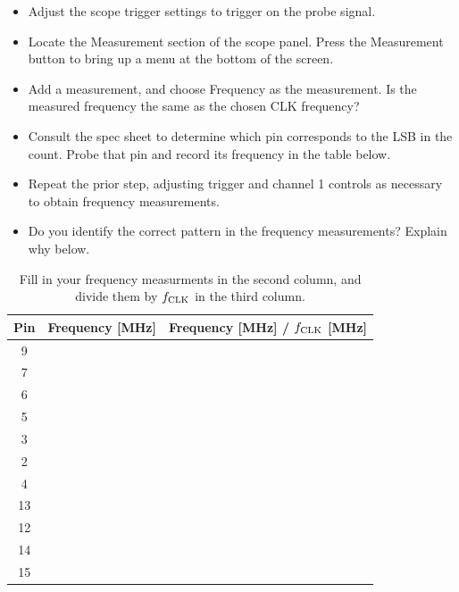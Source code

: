 \documentclass{article}
\begin{document}
\begin{itemize}
\item Adjust the scope trigger settings to trigger on the probe signal.
\item Locate the Measurement section of the scope panel.  Press the Measurement button to bring up a menu at the bottom of the screen.
\item Add a measurement, and choose Frequency as the measurement.  Is the measured frequency the same as the chosen CLK frequency?
\item Consult the spec sheet to determine which pin corresponds to the LSB in the count.  Probe that pin and record its frequency in the table below.
\item Repeat the prior step, adjusting trigger and channel 1 controls as necessary to obtain frequency measurements.
\item Do you identify the correct pattern in the frequency measurements?  Explain why below.
\end{itemize}

\begin{table}
\centering
\begin{tabular}{| c | c | c |}
\hline
Pin & Frequency [MHz] & Frequency [MHz] / $f_{\rm CLK}$ [MHz] \\ \hline
9 & & \\ \hline
7 & & \\ \hline
6 & & \\ \hline
5 & & \\ \hline
3 & & \\ \hline
2 & & \\ \hline
4 & & \\ \hline
13 & & \\ \hline
12 & & \\ \hline
14 & & \\ \hline
15 & & \\ \hline
\end{tabular}
\caption{\label{tab:data} Fill in your frequency measurments in the second column, and divide them by $f_{\rm CLK}$ in the third column.}
\end{table}
\end{document}
